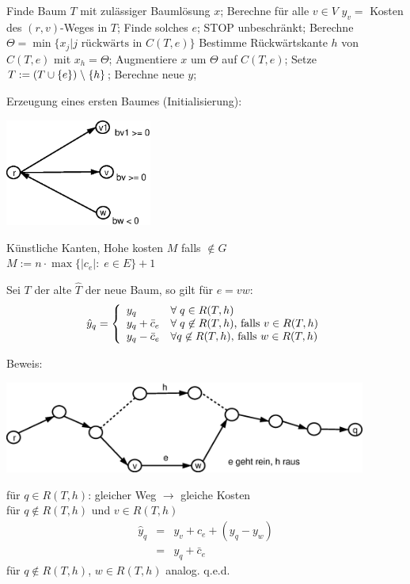 \begin{algorithmic}
\STATE Finde Baum $T$ mit zulässiger Baumlösung $x$;
\STATE Berechne für alle $v\in V$ $y_{v} =$ Kosten des $(r,v)$-Weges in
$T$;
\STATE Finde solches $e$;
\STATE STOP unbeschränkt;
\ENDIF
\STATE Berechne $\Theta = \min\{x_{j} | j \mbox{ rückwärts in } C(T,e)\}$
\STATE Bestimme Rückwärtskante $h$ von $C(T,e)$ mit $x_{h} = \Theta$;
\STATE Augmentiere $x$ um $\Theta$ auf $C(T,e)$;
\STATE Setze $T := (T \cup \{e\}) \;\backslash\; \{h\}$;
\STATE Berechne neue $y$;
\ENDWHILE
\end{algorithmic}

Erzeugung eines ersten Baumes (Initialisierung):

\includegraphics[height=3.5cm]{bilder/4-2NetzSTrans}

Künstliche Kanten, Hohe kosten $M$ falls $\not\in G$\\
$M := n\cdot \max\{|c_{e}|:\;  e \in E\} + 1$

\begin{lemma}\label{EntfNetzS}
Sei $T$ der alte $\hat{T}$ der neue Baum, so gilt für $e=v w$:
\[\hat{y}_{q} = \left\{ \begin{array}{ll}
y_{q} & \forall \; q \in R(T,h)\\
y_{q} + \bar{c}_{e} & \forall \; q \not\in R(T,h) \mbox{, falls } v \in
R(T,h)\\
y_{q} - \bar{c}_{e} & \forall q \not\in R(T,h)  \mbox{, falls } w \in R(T,h) 
\end{array}\right.\]
\end{lemma}
Beweis:

\includegraphics[height=3cm]{bilder/4-2NetzSTransB}

für $q \in R(T,h)$: gleicher Weg $\rightarrow$ gleiche Kosten\\
für $q \not\in R(T,h)$ und $v \in R(T,h)$\\
\[\begin{array}{rcl}
\hat{y}_{q} &= &y_{v} + c_{e} + (y_{q}-y_{w})\\
&=& y_{q} + \bar{c}_{e}\end{array}
\]
für $q \not\in R(T,h)$, $w\in R(T,h)$ analog. q.e.d.

